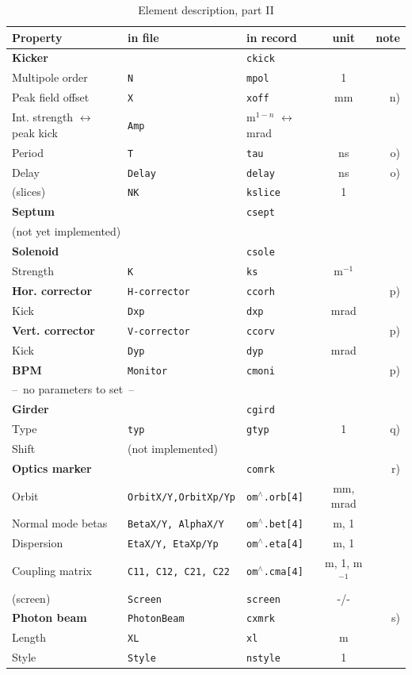 \documentclass[12pt]{article}
\begin{document}
\begin{table}
\caption{\label{tabel1}Element description, part II}\vspace{1em}
\begin{tabular}{lllcr}
Property & in file & in record & unit & note \\
\hline
{\bf Kicker} & {\tt } & {\tt ckick} & &  \\
Multipole order  & {\tt N} & {\tt mpol} & 1 &  \\
Peak field offset  & {\tt X} & {\tt xoff} & mm & n)  \\
Int. strength $\leftrightarrow$ peak kick & {\tt Amp} & m$^{1-n}$ $\leftrightarrow$ mrad & \\
Period & {\tt T} & {\tt tau} & ns & o) \\
Delay & {\tt Delay} & {\tt delay} & ns & o) \\
(slices) & {\tt NK} & {\tt kslice} & 1 & \\
\hline
{\bf Septum} & {\tt } & {\tt csept} & &  \\
\multicolumn{5}{l}{(not yet implemented)} \\
\hline
{\bf Solenoid} & {\tt } & {\tt csole} & &  \\
Strength & {\tt K} & {\tt ks} & m$^{-1}$ &  \\
\hline
{\bf Hor. corrector} & {\tt H-corrector} & {\tt ccorh} & & p) \\
Kick & {\tt Dxp} & {\tt dxp} & mrad &   \\
\hline
{\bf Vert. corrector} & {\tt V-corrector} & {\tt ccorv} & &  p) \\
Kick & {\tt Dyp} & {\tt dyp} & mrad &   \\
\hline
{\bf BPM} & {\tt Monitor } & {\tt cmoni} & &  p) \\
\multicolumn{5}{l}{ --~no parameters to set~-- }\\
\hline
{\bf Girder} & {\tt } & {\tt cgird} & &  \\
Type & {\tt typ} & {\tt gtyp} & 1 &  q) \\
Shift & \multicolumn{4}{l}{(not implemented)} \\
\hline
{\bf Optics marker} & {\tt } & {\tt comrk} & & r) \\
Orbit & {\tt OrbitX/Y,OrbitXp/Yp} & {\tt om$^{\wedge}$.orb[4]} & mm, mrad & \\
Normal mode betas & {\tt BetaX/Y, AlphaX/Y} & {\tt om$^{\wedge}$.bet[4]} & m, 1 & \\
Dispersion & {\tt EtaX/Y, EtaXp/Yp} & {\tt om$^{\wedge}$.eta[4]} & m, 1 & \\
Coupling matrix & {\tt C11, C12, C21, C22} & {\tt om$^{\wedge}$.cma[4]} & m, 1, m$^{-1}$ & \\
(screen) & {\tt Screen} & {\tt screen} & -/- & \\
\hline
{\bf Photon beam} & {\tt PhotonBeam} & {\tt cxmrk} & &  s) \\
Length & {\tt XL} & {\tt xl} & m & \\
Style & {\tt Style} & {\tt nstyle} & 1 &  \\
\hline
\end{tabular}
\end{table}
\end{document}
